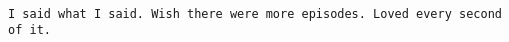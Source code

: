 \documentclass[
]{article}
\begin{document}
\begin{verbatim}
                                                                                                                                                                                                                                                                                                                                                                                                                                                                                                                                                                                                                                                                                                                                                                                                                                                                                                                                                                                                                                                                                                                                                                                                                                                                                                                                                                                                                                                                                                                                                                                                                                                                         I said what I said. Wish there were more episodes. Loved every second of it.

\end{verbatim}
\end{document}
